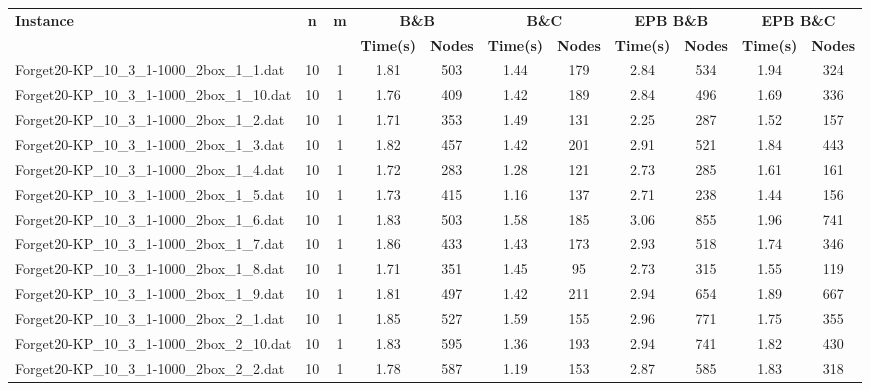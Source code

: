 \begin{table}[!ht]
\centering
\hspace*{-1cm}\begin{tabular}{lcccccccccc}
\toprule
\textbf{Instance} & \textbf{n} & \textbf{m} & \multicolumn{2}{c}{\textbf{B\&B}} & \multicolumn{2}{c}{\textbf{B\&C}}  & \multicolumn{2}{c}{\textbf{EPB B\&B}} & \multicolumn{2}{c}{\textbf{EPB B\&C}} \\

\cmidrule(r){4-5} \cmidrule(r){6-7} \cmidrule(r){8-9} \cmidrule(r){10-11} 
~ & ~ & ~ & \textbf{Time(s)} &\textbf{Nodes} & \textbf{Time(s)} &\textbf{Nodes} & \textbf{Time(s)} &\textbf{Nodes} & \textbf{Time(s)} &\textbf{Nodes}  \\
\midrule

Forget20-KP\_10\_3\_1-1000\_2box\_1\_1.dat & 10 & 1 & 1.81 & 503 & 1.44 & 179 & 2.84 & 534 & 1.94 & 324 \\
Forget20-KP\_10\_3\_1-1000\_2box\_1\_10.dat & 10 & 1 & 1.76 & 409 & 1.42 & 189 & 2.84 & 496 & 1.69 & 336 \\
Forget20-KP\_10\_3\_1-1000\_2box\_1\_2.dat & 10 & 1 & 1.71 & 353 & 1.49 & 131 & 2.25 & 287 & 1.52 & 157 \\
Forget20-KP\_10\_3\_1-1000\_2box\_1\_3.dat & 10 & 1 & 1.82 & 457 & 1.42 & 201 & 2.91 & 521 & 1.84 & 443 \\
Forget20-KP\_10\_3\_1-1000\_2box\_1\_4.dat & 10 & 1 & 1.72 & 283 & 1.28 & 121 & 2.73 & 285 & 1.61 & 161 \\
Forget20-KP\_10\_3\_1-1000\_2box\_1\_5.dat & 10 & 1 & 1.73 & 415 & 1.16 & 137 & 2.71 & 238 & 1.44 & 156 \\
Forget20-KP\_10\_3\_1-1000\_2box\_1\_6.dat & 10 & 1 & 1.83 & 503 & 1.58 & 185 & 3.06 & 855 & 1.96 & 741 \\
Forget20-KP\_10\_3\_1-1000\_2box\_1\_7.dat & 10 & 1 & 1.86 & 433 & 1.43 & 173 & 2.93 & 518 & 1.74 & 346 \\
Forget20-KP\_10\_3\_1-1000\_2box\_1\_8.dat & 10 & 1 & 1.71 & 351 & 1.45 & 95 & 2.73 & 315 & 1.55 & 119 \\
Forget20-KP\_10\_3\_1-1000\_2box\_1\_9.dat & 10 & 1 & 1.81 & 497 & 1.42 & 211 & 2.94 & 654 & 1.89 & 667 \\
Forget20-KP\_10\_3\_1-1000\_2box\_2\_1.dat & 10 & 1 & 1.85 & 527 & 1.59 & 155 & 2.96 & 771 & 1.75 & 355 \\
Forget20-KP\_10\_3\_1-1000\_2box\_2\_10.dat & 10 & 1 & 1.83 & 595 & 1.36 & 193 & 2.94 & 741 & 1.82 & 430 \\
Forget20-KP\_10\_3\_1-1000\_2box\_2\_2.dat & 10 & 1 & 1.78 & 587 & 1.19 & 153 & 2.87 & 585 & 1.83 & 318 \\

\end{tabular}
\end{table}
